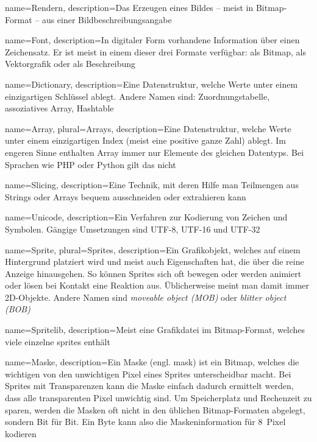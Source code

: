 {
	name={Rendern},
	description={Das Erzeugen eines Bildes -- meist in Bitmap-Format -- aus einer Bildbeschreibungsangabe} 
}

{
	name={Font},
	description={In digitaler Form vorhandene Information über einen Zeichensatz. Er ist meist in einem dieser drei Formate verfügbar: als Bitmap, als Vektorgrafik oder als Beschreibung} 
}

{
	name={Dictionary},
	description={Eine Datenstruktur, welche Werte unter einem einzigartigen Schlüssel ablegt. Andere Namen sind: Zuordnungstabelle, assoziatives Array, Hashtable} 
}

{
	name={Array},
    plural={Arrays},
	description={Eine Datenstruktur, welche Werte unter einem einzigartigen Index (meist eine positive ganze Zahl) ablegt. Im engeren Sinne enthalten Array immer nur Elemente des gleichen Datentyps. Bei Sprachen wie PHP oder Python gilt das nicht} 
}

{
	name={Slicing},
	description={Eine Technik, mit deren Hilfe man Teilmengen aus Strings oder Arrays bequem ausschneiden oder extrahieren kann} 
}

{
	name={Unicode},
	description={Ein Verfahren zur Kodierung von Zeichen und Symbolen. Gängige Umsetzungen sind UTF-8, UTF-16 und UTF-32} 
}

{
	name={Sprite},
    plural={Sprites},
	description={Ein Grafikobjekt, welches auf einem Hintergrund platziert wird und meist auch Eigenschaften hat, die über die reine Anzeige hinausgehen. So können Sprites sich oft bewegen oder werden animiert oder lösen bei Kontakt eine Reaktion aus. Üblicherweise meint man damit immer 2D-Objekte. Andere Namen sind \emph{moveable object (MOB)} oder \emph{blitter object (BOB)} } 
}

{
	name={Spritelib},
	description={Meist eine Grafikdatei im Bitmap-Format, welches viele einzelne \glspl{sprite} enthält} 
}

{
	name={Maske},
	description={Ein Maske (engl. mask) ist ein Bitmap, welches die wichtigen von den unwichtigen Pixel eines Sprites unterscheidbar macht. Bei Sprites mit Transparenzen kann die Maske einfach dadurch ermittelt werden, dass alle transparenten Pixel unwichtig sind. Um Speicherplatz und Rechenzeit zu sparen, werden die Masken oft nicht in den üblichen Bitmap-Formaten abgelegt, sondern Bit für Bit. Ein Byte kann also die Maskeninformation für 8~Pixel kodieren} 
}

